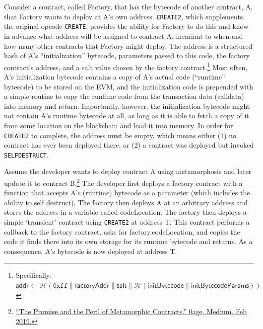 Consider a contract, called Factory, that has the bytecode of another contract, A, that Factory wants to deploy at A's own address. \texttt{CREATE2}, which supplements the original opcode \texttt{CREATE}, provides the ability for Factory to do this and know in advance what address will be assigned to contract A, invariant to when and how many other contracts that Factory might deploy.  The address is a structured hash of A's ``initialization'' bytecode, parameters passed to this code, the factory contract's address, and a salt value chosen by the factory contract.\footnote{Specifically: $\mathsf{addr} \leftarrow \mathcal{H}(\mathtt{0xff} \| \mathsf{factoryAddr} \| \mathsf{salt} \| \mathcal{H} (\mathsf{initBytecode} \| \mathsf{initBytecodeParams}))$} Most often, A's initialization bytecode contains a copy of A's actual code (``runtime'' bytecode) to be stored on the EVM, and the initialization code is prepended with a simple routine to copy the runtime code from the transaction data (calldata) into memory and return. Importantly, however, the initialization bytecode might not contain A's runtime bytecode at all, as long as it is able to fetch a copy of it from some location on the blockchain and load it into memory. In order for \texttt{CREATE2} to complete, the address must be empty, which means either (1) no contract has ever been deployed there, or (2) a contract was deployed but invoked \texttt{SELFDESTRUCT}.



Assume the developer wants to deploy contract A using metamorphosis and later update it to contract B.\footnote{\href{https://medium.com/@0age/the-promise-and-the-peril-of-metamorphic-contracts-9eb8b8413c5e}{``The Promise and the Peril of Metamorphic Contracts.'' 0age, Medium, Feb 2019.}} The developer first deploys a factory contract with a function that accepts A's (runtime) bytecode as a parameter (which includes the ability to self destruct). The factory then deploys A at an arbitrary address and stores the address in a variable called codeLocation. The factory then deploys a simple `transient' contract using \texttt{CREATE2} at address T. This contract performs a callback to the factory contract, asks for factory.codeLocation, and copies the code it finds there into its own storage for its runtime bytecode and returns. As a consequence, A's bytecode is now deployed at address T. 

